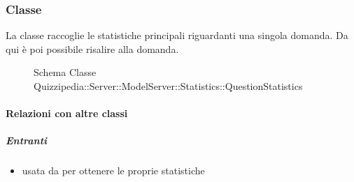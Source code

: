 \subsubsection{Classe }
La classe raccoglie le statistiche principali riguardanti una singola domanda. Da qui è poi possibile risalire alla domanda.
\begin{figure}[H]
\centering
\noindent{}
\caption[Schema Classe QuestionStatistics]{Schema Classe Quizzipedia::Server::ModelServer::Statistics::QuestionStatistics}
\end{figure}
\paragraph{Relazioni con altre classi}
\subparagraph{Entranti}
\begin{itemize}
\item usata da  per ottenere le proprie statistiche
\end{itemize}
